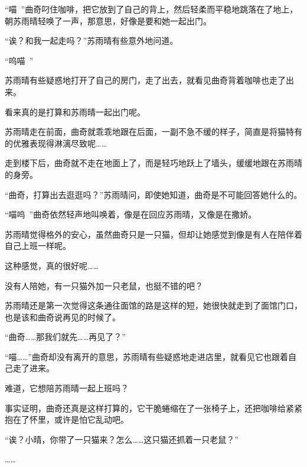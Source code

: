 “喵~”曲奇叼住咖啡，把它放到了自己的背上，然后轻柔而平稳地跳落在了地上，朝苏雨晴轻唤了一声，那意思，好像是要和她一起出门。

“诶？和我一起走吗？”苏雨晴有些意外地问道。

“呜喵~”

苏雨晴有些疑惑地打开了自己的房门，走了出去，就看见曲奇背着咖啡也走了出来。

看来真的是打算和苏雨晴一起出门呢。

苏雨晴走在前面，曲奇就乖乖地跟在后面，一副不急不缓的样子，简直是将猫特有的优雅表现得淋漓尽致呢……

走到楼下后，曲奇就不走在地面上了，而是轻巧地跃上了墙头，缓缓地跟在苏雨晴的身旁。

“曲奇，打算出去逛逛吗？”苏雨晴问，即使她知道，曲奇是不可能回答她什么的。

“喵呜~”曲奇依然轻声地叫唤着，像是在回应苏雨晴，又像是在撒娇。

苏雨晴觉得格外的安心，虽然曲奇只是一只猫，但却让她感觉到像是有人在陪伴着自己上班一样呢。

这种感觉，真的很好呢……

没有人陪她，有一只猫外加一只老鼠，也挺不错的吧？

苏雨晴还是第一次觉得这条通往面馆的路是这样的短，她很快就走到了面馆门口，也是该和曲奇说再见的时候了。

“曲奇……那我们就先……再见了？”

“喵……”曲奇却没有离开的意思，苏雨晴有些疑惑地走进店里，就看见它也跟着自己走了进来。

难道，它想陪苏雨晴一起上班吗？

事实证明，曲奇还真是这样打算的，它干脆蜷缩在了一张椅子上，还把咖啡给紧紧抱在了怀里，或许是怕它乱动吧。

“诶？小晴，你带了一只猫来？怎么……这只猫还抓着一只老鼠？”

……

